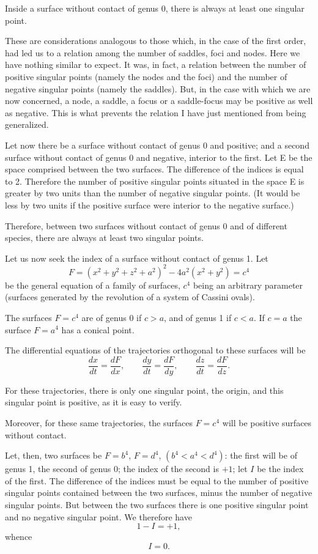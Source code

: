 \documentclass[11pt]{article}
\begin{document}
Inside a surface without contact of genus 0, there is always at least one singular point.

These are considerations analogous to those which, in the case of the first order, had led us to a relation among the number of saddles, foci and nodes. Here we have nothing similar to expect. It was, in fact, a relation between the number of positive singular points (namely the nodes and the foci) and the number of negative singular points (namely the saddles). But, in the case with which we are now concerned, a node, a saddle, a focus or a saddle-focus may be positive as well as negative. This is what prevents the relation I have just mentioned from being generalized.

Let now there be a surface without contact of genus 0 and positive; and a second surface without contact of genus 0 and negative, interior to the first. Let E be the space comprised between the two surfaces. The difference of the indices is equal to 2. Therefore the number of positive singular points situated in the space E is greater by two units than the number of negative singular points. (It would be less by two units if the positive surface were interior to the negative surface.)

Therefore, between two surfaces without contact of genus 0 and of different species, there are always at least two singular points.

Let us now seek the index of a surface without contact of genus 1. Let
\[
F=(x^2+y^2+z^2+a^2)^2-4a^2(x^2+y^2)=c^4
\]
be the general equation of a family of surfaces, $c^4$ being an arbitrary parameter (surfaces generated by the revolution of a system of Cassini ovals).

The surfaces $F=c^4$ are of genus 0 if $c>a$, and of genus 1 if $c<a$. If $c=a$ the surface $F=a^4$ has a conical point.

The differential equations of the trajectories orthogonal to these surfaces will be
\[
\frac{dx}{dt}=\frac{dF}{dx},
\qquad
\frac{dy}{dt}=\frac{dF}{dy},
\qquad
\frac{dz}{dt}=\frac{dF}{dz}.
\]

For these trajectories, there is only one singular point, the origin, and this singular point is positive, as it is easy to verify.

Moreover, for these same trajectories, the surfaces $F=c^4$ will be positive surfaces without contact.

Let, then, two surfaces be $F=b^4$, $F=d^4$, $(b^4<a^4<d^4)$: the first will be of genus 1, the second of genus 0; the index of the second is $+1$; let $I$ be the index of the first. The difference of the indices must be equal to the number of positive singular points contained between the two surfaces, minus the number of negative singular points. But between the two surfaces there is one positive singular point and no negative singular point. We therefore have
\[
1-I=+1,
\]
whence
\[
I=0.
\]
\end{document}
